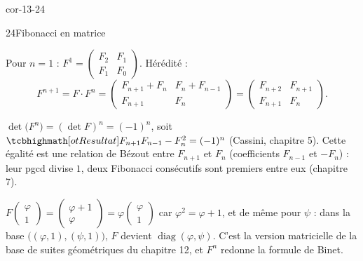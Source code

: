 \begin{blocLivre}{cor-13-24}
\begin{corrige}{24}{Fibonacci en matrice}
\begin{questions}
  \item Pour $n=1$ : $F^{1}=\begin{pmatrix}F_2&F_1\\F_1&F_0\end{pmatrix}$.
    Hérédité :
    \[
    F^{n+1}=F\cdot F^{n}
    =\begin{pmatrix}F_{n+1}+F_n&F_n+F_{n-1}\\F_{n+1}&F_n\end{pmatrix}
    =\begin{pmatrix}F_{n+2}&F_{n+1}\\F_{n+1}&F_n\end{pmatrix}.
    \]
  \item $\det\bigl(F^{n}\bigr)=(\det F)^{n}=(-1)^{n}$, soit
    $\res{F_{n+1}F_{n-1}-F_n^{2}=(-1)^{n}}$ (Cassini, chapitre 5). Cette
    égalité est une relation de Bézout entre $F_{n+1}$ et $F_n$
    (coefficients $F_{n-1}$ et $-F_n$) : leur pgcd divise $1$, deux
    Fibonacci consécutifs sont premiers entre eux (chapitre 7).
  \item $F\begin{pmatrix}\varphi\\1\end{pmatrix}
    =\begin{pmatrix}\varphi+1\\\varphi\end{pmatrix}
    =\varphi\begin{pmatrix}\varphi\\1\end{pmatrix}$ car
    $\varphi^{2}=\varphi+1$, et de même pour $\psi$ : dans la base
    $\bigl((\varphi,1),(\psi,1)\bigr)$, $F$ devient
    $\operatorname{diag}(\varphi,\psi)$. C'est la version matricielle de
    la base de suites géométriques du chapitre 12, et $F^{n}$ redonne la
    formule de Binet.
\end{questions}
\end{corrige}
\end{blocLivre}


